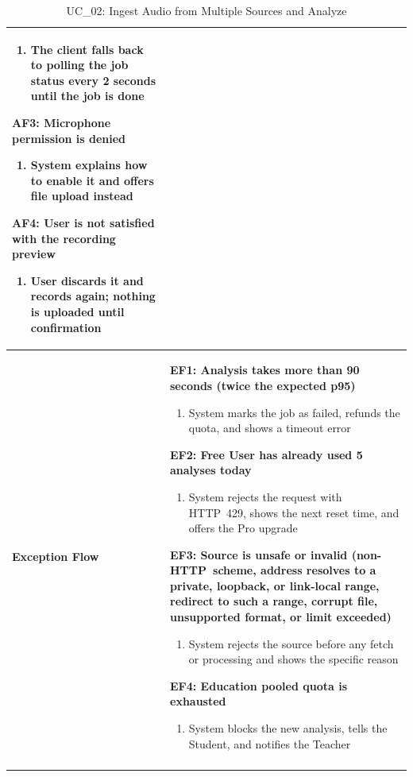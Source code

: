 \documentclass[a4paper]{article}
\newlength{\ucLeft}
\begin{document}
\begin{longtable}{|>{\bfseries}p{\ucLeft}|p{\dimexpr\linewidth-\ucLeft-2\tabcolsep-2\arrayrulewidth}|}
\begin{enumerate}[leftmargin=1.5em, nosep, topsep=2pt, partopsep=0pt, parsep=0pt, after=\strut]
    \item The client falls back to polling the job status every 2 seconds until the job is done
\end{enumerate}
\textbf{AF3: Microphone permission is denied}
\begin{enumerate}[leftmargin=1.5em, nosep, topsep=2pt, partopsep=0pt, parsep=0pt, after=\strut]
    \item System explains how to enable it and offers file upload instead
\end{enumerate}
\textbf{AF4: User is not satisfied with the recording preview}
\begin{enumerate}[leftmargin=1.5em, nosep, topsep=2pt, partopsep=0pt, parsep=0pt, after=\strut]
    \item User discards it and records again; nothing is uploaded until confirmation
\end{enumerate}
\\ \hline
Exception Flow &
\textbf{EF1: Analysis takes more than 90 seconds (twice the expected p95)}
\begin{enumerate}[leftmargin=1.5em, nosep, topsep=2pt, partopsep=0pt, parsep=0pt, after=\strut]
    \item System marks the job as failed, refunds the quota, and shows a timeout error
\end{enumerate}
\textbf{EF2: Free User has already used 5 analyses today}
\begin{enumerate}[leftmargin=1.5em, nosep, topsep=2pt, partopsep=0pt, parsep=0pt, after=\strut]
    \item System rejects the request with HTTP~429, shows the next reset time, and offers the Pro upgrade
\end{enumerate}
\textbf{EF3: Source is unsafe or invalid (non-HTTP~scheme, address resolves to a private, loopback, or link-local range, redirect to such a range, corrupt file, unsupported format, or limit exceeded)}
\begin{enumerate}[leftmargin=1.5em, nosep, topsep=2pt, partopsep=0pt, parsep=0pt, after=\strut]
    \item System rejects the source before any fetch or processing and shows the specific reason
\end{enumerate}
\textbf{EF4: Education pooled quota is exhausted}
\begin{enumerate}[leftmargin=1.5em, nosep, topsep=2pt, partopsep=0pt, parsep=0pt, after=\strut]
    \item System blocks the new analysis, tells the Student, and notifies the Teacher
\end{enumerate}
\\ \hline
\caption{UC\_02: Ingest Audio from Multiple Sources and Analyze}\label{tab:uc02}
\end{longtable}
\end{document}
